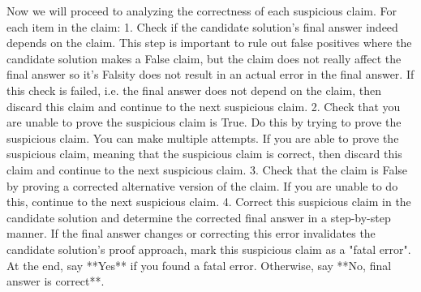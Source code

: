 \begin{tcolorbox}[breakable,title=Verification Prompt 7]
Now we will proceed to analyzing the correctness of each suspicious claim. For each item in the claim:
1. Check if the candidate solution's final answer indeed depends on the claim. This step is important to rule out false positives where the candidate solution makes a False claim, but the claim does not really affect the final answer so it's Falsity does not result in an actual error in the final answer. If this check is failed, i.e. the final answer does not depend on the claim, then discard this claim and continue to the next suspicious claim.
2. Check that you are unable to prove the suspicious claim is True. Do this by trying to prove the suspicious claim. You can make multiple attempts. If you are able to prove the suspicious claim, meaning that the suspicious claim is correct, then discard this claim and continue to the next suspicious claim.
3. Check that the claim is False by proving a corrected alternative version of the claim. If you are unable to do this, continue to the next suspicious claim.
4. Correct this suspicious claim in the candidate solution and determine the corrected final answer in a step-by-step manner. If the final answer changes or correcting this error invalidates the candidate solution's proof approach, mark this suspicious claim as a "fatal error".
At the end, say **Yes** if you found a fatal error. Otherwise, say **No, final answer is correct**.
\end{tcolorbox}

